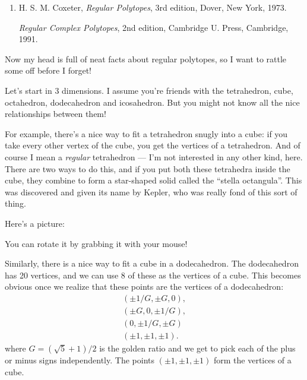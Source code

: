 \documentclass{article}
\def\tightlist{}
\renewcommand{\texttt}[1]{%
  \begingroup
  \ttfamily
  \begingroup\lccode`~=`/\lowercase{\endgroup\def~}{/\discretionary{}{}{}}%
  \begingroup\lccode`~=`[\lowercase{\endgroup\def~}{[\discretionary{}{}{}}%
  \begingroup\lccode`~=`.\lowercase{\endgroup\def~}{.\discretionary{}{}{}}%
  \catcode`/=\active\catcode`[=\active\catcode`.=\active
  \scantokens{#1\noexpand}%
  \endgroup
}
\begin{document}
\begin{enumerate}
\def\labelenumi{\arabic{enumi})}
\setcounter{enumi}{1}
\item
  H. S. M. Coxeter, \emph{Regular Polytopes}, 3rd edition, Dover, New
  York, 1973.

  \emph{Regular Complex Polytopes}, 2nd edition, Cambridge U. Press,
  Cambridge, 1991.
\end{enumerate}

Now my head is full of neat facts about regular polytopes, so I want to
rattle some off before I forget!

Let's start in 3 dimensions. I assume you're friends with the
tetrahedron, cube, octahedron, dodecahedron and icosahedron. But you
might not know all the nice relationships between them!

For example, there's a nice way to fit a tetrahedron snugly into a cube:
if you take every other vertex of the cube, you get the vertices of a
tetrahedron. And of course I mean a \emph{regular} tetrahedron --- I'm
not interested in any other kind, here. There are two ways to do this,
and if you put both these tetrahedra inside the cube, they combine to
form a star-shaped solid called the ``stella octangula''. This was
discovered and given its name by Kepler, who was really fond of this
sort of thing.

Here's a picture:


You can rotate it by grabbing it with your mouse!

Similarly, there is a nice way to fit a cube in a dodecahedron. The
dodecahedron has 20 vertices, and we can use 8 of these as the vertices
of a cube. This becomes obvious once we realize that these points are
the vertices of a dodecahedron: \[
  \begin{gathered}
    (\pm 1/G, \pm G, 0),
  \\(\pm G, 0, \pm 1/G),
  \\(0, \pm 1/G, \pm G)
  \\(\pm1, \pm1, \pm1).
  \end{gathered}
\] where \(G = (\sqrt{5} + 1)/2\) is the golden ratio and we get to pick
each of the plus or minus signs independently. The points
\((\pm1, \pm1, \pm1)\) form the vertices of a cube.
\end{document}
